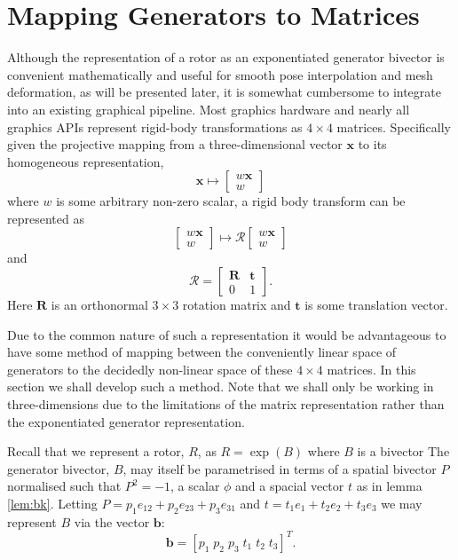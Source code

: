 

\section{Mapping Generators to Matrices}

Although the representation of a rotor as an exponentiated generator bivector
is convenient mathematically and useful for smooth pose interpolation
and mesh deformation, as will be presented later, it is somewhat cumbersome
to integrate into an existing graphical pipeline. Most graphics hardware and
nearly all graphics APIs represent rigid-body transformations as $4 \times 4$ matrices.
Specifically given the projective mapping from a three-dimensional vector $\mathbf{x}$ to
its homogeneous representation,
\[
\mathbf{x} \mapsto \left[ \begin{array}{c}
w \mathbf{x} \\ w
\end{array}\right]
\]
where $w$ is some arbitrary non-zero scalar, a rigid body transform can be represented as
\[
 \left[ \begin{array}{c}
w \mathbf{x} \\ w
\end{array}\right]
\mapsto
 \mathcal{R}\left[ \begin{array}{c}
w \mathbf{x} \\ w
\end{array}\right]
\]
and
\[
\mathcal{R} = \left[
\begin{array}{cc}
\mathbf{R} & \mathbf{t} \\
                0 & 1
\end{array}
\right].
\]
Here $\mathbf{R}$ is an orthonormal $3 \times 3$ rotation matrix and $\mathbf{t}$ is some
translation vector.

Due to the common nature of such a representation it would be advantageous to
have some method of mapping between the conveniently linear space of
generators to the decidedly non-linear space of these $4 \times 4$ matrices.
In this section we shall develop such a method. Note that we shall only be
working in three-dimensions due to the limitations of the matrix
representation rather than the exponentiated generator representation.

Recall that we represent a rotor, $R$, as $R = \exp(B)$ where $B$ is a bivector
The generator bivector, $B$, may itself be
parametrised in terms of a spatial bivector $P$ normalised such that
$P^2 = -1$, a scalar $\phi$ and a spacial vector $t$
as in lemma \ref{lem:bk}.
Letting $P = p_1 e_{12} + p_2 e_{23} + p_3 e_{31}$ and
$t = t_1 e_1 + t_2 e_2 + t_3 e_3$ we may represent $B$ via the
vector $\mathbf{b}$:
\[
\mathbf{b} = [ p_1 \; p_2 \; p_3 \; t_1 \; t_2 \; t_3 ]^T.
\]

